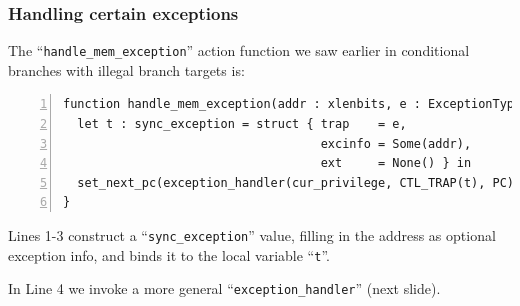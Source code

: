 \documentclass[aspectratio=169]{beamer}
\newcommand{\slidefont}{\scriptsize}
\newcommand{\cf}{\scriptsize\tt}
\begin{document}
\begin{frame}[fragile]
  \frametitle{Handling certain exceptions}

  \slidefont

  The ``{\cf handle\_mem\_exception}'' action function we saw earlier
  in conditional branches with illegal branch targets is:

  \vspace{1ex}

  \begin{Verbatim}[frame=single, numbers=left, label = File riscv\_sys\_control.sail]
function handle_mem_exception(addr : xlenbits, e : ExceptionType) -> unit = {
  let t : sync_exception = struct { trap    = e,
                                    excinfo = Some(addr),
                                    ext     = None() } in
  set_next_pc(exception_handler(cur_privilege, CTL_TRAP(t), PC))
}
  \end{Verbatim}

  \begin{minipage}{\textwidth}
    Lines 1-3 construct a ``{\cf sync\_exception}'' value, filling in
    the address as optional exception info, and binds it to the local
    variable ``{\cf t}''.

    \vspace{1ex}

    In Line 4 we invoke a more general ``{\cf exception\_handler}'' (next slide).
  \end{minipage}

\end{frame}

\end{document}

